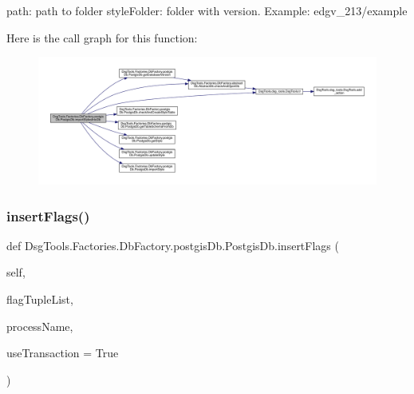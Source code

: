 \begin{DoxyVerb}path: path to folder
styleFolder: folder with version. Example: edgv_213/example
\end{DoxyVerb}
 Here is the call graph for this function\+:
\nopagebreak
\begin{figure}[H]
\begin{center}
\leavevmode
\includegraphics[width=350pt]{class_dsg_tools_1_1_factories_1_1_db_factory_1_1postgis_db_1_1_postgis_db_ac42464167014927751a4ad7133f34197_cgraph}
\end{center}
\end{figure}
\mbox{\label{class_dsg_tools_1_1_factories_1_1_db_factory_1_1postgis_db_1_1_postgis_db_acaefaf8ad3940bba3d485564aed4846c}} 
\subsubsection{\texorpdfstring{insert\+Flags()}{insertFlags()}}
{\footnotesize\ttfamily def Dsg\+Tools.\+Factories.\+Db\+Factory.\+postgis\+Db.\+Postgis\+Db.\+insert\+Flags (\begin{DoxyParamCaption}\item[{}]{self,  }\item[{}]{flag\+Tuple\+List,  }\item[{}]{process\+Name,  }\item[{}]{use\+Transaction = {\ttfamily True} }\end{DoxyParamCaption})}

